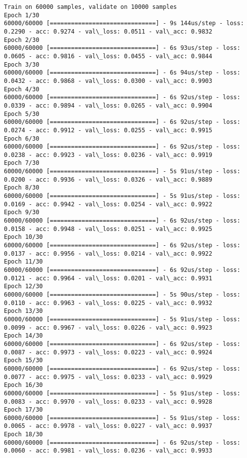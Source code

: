 \documentclass[11pt]{article}
\begin{document}
    \begin{Verbatim}[commandchars=\\\{\}]
Train on 60000 samples, validate on 10000 samples
Epoch 1/30
60000/60000 [==============================] - 9s 144us/step - loss: 0.2290 - acc: 0.9274 - val\_loss: 0.0511 - val\_acc: 0.9832
Epoch 2/30
60000/60000 [==============================] - 6s 93us/step - loss: 0.0605 - acc: 0.9816 - val\_loss: 0.0455 - val\_acc: 0.9844
Epoch 3/30
60000/60000 [==============================] - 6s 94us/step - loss: 0.0432 - acc: 0.9868 - val\_loss: 0.0300 - val\_acc: 0.9903
Epoch 4/30
60000/60000 [==============================] - 6s 92us/step - loss: 0.0339 - acc: 0.9894 - val\_loss: 0.0265 - val\_acc: 0.9904
Epoch 5/30
60000/60000 [==============================] - 6s 92us/step - loss: 0.0274 - acc: 0.9912 - val\_loss: 0.0255 - val\_acc: 0.9915
Epoch 6/30
60000/60000 [==============================] - 6s 92us/step - loss: 0.0238 - acc: 0.9923 - val\_loss: 0.0236 - val\_acc: 0.9919
Epoch 7/30
60000/60000 [==============================] - 5s 91us/step - loss: 0.0200 - acc: 0.9936 - val\_loss: 0.0326 - val\_acc: 0.9889
Epoch 8/30
60000/60000 [==============================] - 5s 91us/step - loss: 0.0169 - acc: 0.9942 - val\_loss: 0.0254 - val\_acc: 0.9922
Epoch 9/30
60000/60000 [==============================] - 6s 92us/step - loss: 0.0158 - acc: 0.9948 - val\_loss: 0.0251 - val\_acc: 0.9925
Epoch 10/30
60000/60000 [==============================] - 6s 92us/step - loss: 0.0137 - acc: 0.9956 - val\_loss: 0.0214 - val\_acc: 0.9922
Epoch 11/30
60000/60000 [==============================] - 6s 92us/step - loss: 0.0121 - acc: 0.9964 - val\_loss: 0.0201 - val\_acc: 0.9931
Epoch 12/30
60000/60000 [==============================] - 5s 90us/step - loss: 0.0110 - acc: 0.9963 - val\_loss: 0.0225 - val\_acc: 0.9932
Epoch 13/30
60000/60000 [==============================] - 5s 91us/step - loss: 0.0099 - acc: 0.9967 - val\_loss: 0.0226 - val\_acc: 0.9923
Epoch 14/30
60000/60000 [==============================] - 6s 92us/step - loss: 0.0087 - acc: 0.9973 - val\_loss: 0.0223 - val\_acc: 0.9924
Epoch 15/30
60000/60000 [==============================] - 6s 92us/step - loss: 0.0077 - acc: 0.9975 - val\_loss: 0.0233 - val\_acc: 0.9929
Epoch 16/30
60000/60000 [==============================] - 5s 91us/step - loss: 0.0083 - acc: 0.9970 - val\_loss: 0.0233 - val\_acc: 0.9928
Epoch 17/30
60000/60000 [==============================] - 5s 91us/step - loss: 0.0065 - acc: 0.9978 - val\_loss: 0.0227 - val\_acc: 0.9937
Epoch 18/30
60000/60000 [==============================] - 6s 92us/step - loss: 0.0060 - acc: 0.9981 - val\_loss: 0.0236 - val\_acc: 0.9933

\end{Verbatim}
\end{document}

